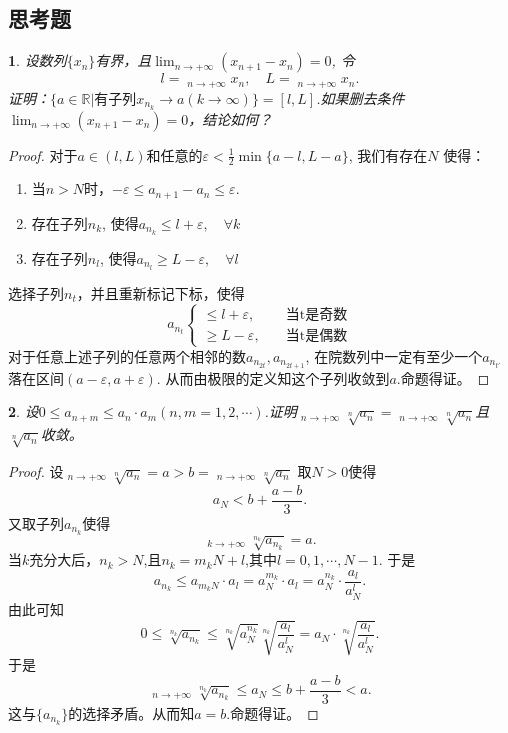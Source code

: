 \documentclass[utf8]{book}
\newtheorem{example}{}[section]             %
\DeclareMathOperator*\lowlim{\underline{lim}}
\DeclareMathOperator*\uplim{\overline{lim}}
\begin{document}
\subsection{思考题}
\begin{example}
设数列$\{x_n\}$有界，且$\displaystyle\lim_{n\to +\infty}(x_{n+1}-x_n) = 0$, 令
$$l=\displaystyle\lowlim_{n\to +\infty}x_n, \quad L=\displaystyle\uplim_{n\to +\infty}x_n.$$
证明：$\{a\in\mathbb{R} | \text{有子列}x_{n_k}\rightarrow a(k\rightarrow \infty)\}=[l,L]$.如果删去条件$\displaystyle\lim_{n\to +\infty}(x_{n+1}-x_n) = 0$，结论如何？
\end{example}
\begin{proof}
对于$a\in (l, L)$和任意的$\varepsilon < \frac{1}{2}\min\{a-l, L-a\}$, 我们有存在$N$
使得：
\renewcommand\labelenumi{\normalfont(\theenumi)}
\begin{enumerate}
\item 当$n>N$时，$-\varepsilon \leq a_{n+1} - a_n \leq \varepsilon$.
\item 存在子列$n_{k}$, 使得$a_{n_k} \leq l +\varepsilon, \quad\forall k$
\item 存在子列$n_{l}$, 使得$a_{n_l}\geq L -\varepsilon,\quad\forall l$
\end{enumerate}
选择子列$n_{t}$，并且重新标记下标，使得
\begin{equation*}
a_{n_{t}}
\begin{cases} 
\leq l + \varepsilon, &\quad \text{当t是奇数}\\
\geq L -\varepsilon, &\quad \text{当t是偶数}
\end{cases}
\end{equation*}
对于任意上述子列的任意两个相邻的数$a_{n_{2t}}, a_{n_{2t+1}}$, 在院数列中一定有至少一个$a_{n_{t'}}$落在区间$(a-\varepsilon, a+\varepsilon)$. 从而由极限的定义知这个子列收敛到$a$.命题得证。
\end{proof}
\begin{example}
设$0\leq a_{n+m}\leq a_n\cdot a_m(n,m=1,2,\cdots)$.证明$\displaystyle\uplim_{n\to +\infty}\sqrt[n]{a_n} = \displaystyle\lowlim_{n\to +\infty}\sqrt[n]{a_n}$且$\sqrt[n]{a_n}$收敛。
\end{example}
\begin{proof}
设$\displaystyle\uplim_{n\to +\infty}\sqrt[n]{a_n} 
=a > b=\displaystyle\lowlim_{n\to +\infty}\sqrt[n]{a_n}$
取$N > 0$使得 $$a_N < b +\frac{a-b}{3}.$$
又取子列$a_{n_k}$使得
$$\displaystyle\uplim_{k\to +\infty}\sqrt[n_{k}]{a_{n_k}} = a.$$
当$k$充分大后，$n_k > N$,且$n_k = m_kN + l$,其中$l = 0, 1, \cdots, N - 1$.
于是$$a_{n_k} \leq a_{m_kN}\cdot a_l = a_N^{m_k}\cdot a_l = a_N^{n_k}\cdot \frac{a_l}{a_N^{l}}.$$
由此可知
$$0 \leq \sqrt[n_k]{a_{n_k}}\leq \sqrt[n_k]{a_N^{n_k}}\sqrt[n_k]{\frac{a_l}{a_N^{l}}}= a_N\cdot\sqrt[n_k]{\frac{a_l}{a_N^{l}}}.$$
于是
$$\displaystyle\uplim_{n\to +\infty}\sqrt[n_k]{a_{n_k}} \leq a_N \leq b+\frac{a-b}{3} < a.$$
这与$\{a_{n_k}\}$的选择矛盾。从而知$a=b$.命题得证。
\end{proof}
\end{document}
